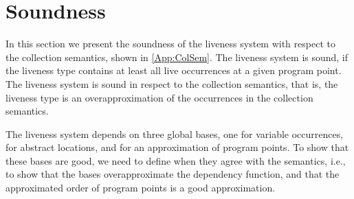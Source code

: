 \documentclass[../../master.tex]{subfiles}
\begin{document}
\section{Soundness}
In this section we present the soundness of the liveness system with respect to the collection semantics, shown in \cref{App:ColSem}.
The liveness system is sound, if the liveness type contains at least all live occurrences at a given program point.
The liveness system is sound in respect to the collection semantics, that is, the liveness type is an overapproximation of the occurrences in the collection semantics.

The liveness system depends on three global bases, one for variable occurrences, for abstract locations, and for an approximation of program points.
To show that these bases are good, we need to define when they agree with the semantics, i.e., to show that the bases overapproximate the dependency function, and that the approximated order of program points is a good approximation.




\end{document}
